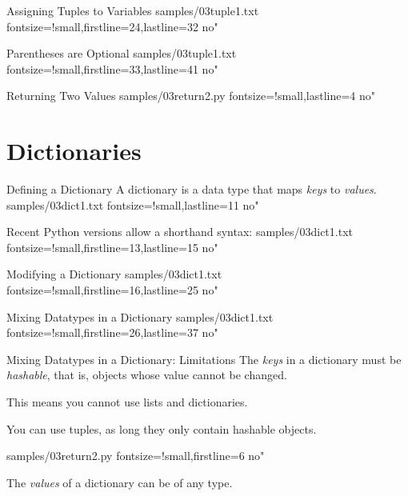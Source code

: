 \documentclass{pyslides}
\begin{document}
\begin{frame}[fragile]{Assigning Tuples to Variables}
 samples/03tuple1.txt fontsize=!small,firstline=24,lastline=32 no"
\end{frame}

\begin{frame}[fragile]{Parentheses are Optional}
 samples/03tuple1.txt fontsize=!small,firstline=33,lastline=41 no"
\end{frame}

\begin{frame}[fragile]{Returning Two Values}
 samples/03return2.py fontsize=!small,lastline=4 no"
\end{frame}

\section{Dictionaries}

\begin{frame}[fragile]{Defining a Dictionary}
A dictionary is a data type that maps \emph{keys} to \emph{values}.
 samples/03dict1.txt fontsize=!small,lastline=11 no"

\bigskip

Recent Python versions allow a shorthand syntax:
 samples/03dict1.txt fontsize=!small,firstline=13,lastline=15 no"
\end{frame}

\begin{frame}[fragile]{Modifying a Dictionary}
 samples/03dict1.txt fontsize=!small,firstline=16,lastline=25 no"

\end{frame}

\begin{frame}[fragile]{Mixing Datatypes in a Dictionary}
 samples/03dict1.txt fontsize=!small,firstline=26,lastline=37 no"
\end{frame}

\begin{frame}[fragile]{Mixing Datatypes in a Dictionary: Limitations}
The \emph{keys} in a dictionary must be \emph{hashable}, that is, objects whose value cannot be changed.

\bigskip

This means you cannot use lists and dictionaries.

You can use tuples, as long they only contain hashable objects.

 samples/03return2.py fontsize=!small,firstline=6 no"

\bigskip

The \emph{values} of a dictionary can be of any type.

\end{frame}
\end{document}
